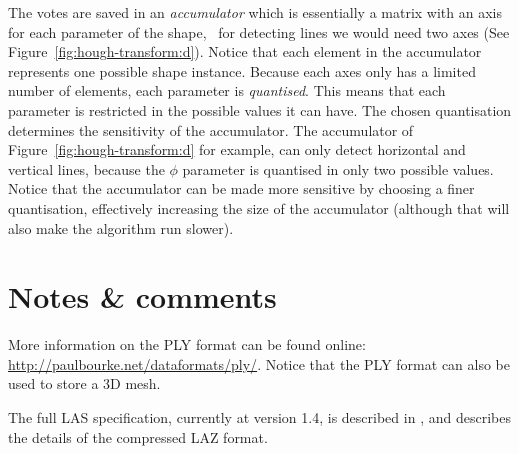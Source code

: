 The votes are saved in an \emph{accumulator} which is essentially a matrix with an axis for each parameter of the shape, \eg\ for detecting lines we would need two axes (See Figure~\ref{fig:hough-transform:d}).
Notice that each element in the accumulator represents one possible shape instance.
Because each axes only has a limited number of elements, each parameter is \emph{quantised}.
This means that each parameter is restricted in the possible values it can have.
The chosen quantisation determines the sensitivity of the accumulator.
The accumulator of Figure~\ref{fig:hough-transform:d} for example, can only detect horizontal and vertical lines, because the $\phi$ parameter is quantised in only two possible values.
Notice that the accumulator can be made more sensitive by choosing a finer quantisation, effectively increasing the size of the accumulator (although that will also make the algorithm run slower).


%
%
%
%
%


%
\section{Notes \& comments}
More information on the PLY format can be found online: \url{http://paulbourke.net/dataformats/ply/}. 
Notice that the PLY format can also be used to store a 3D mesh.

The full LAS specification, currently at version 1.4, is described in \citet{LAS13}, and \citet{Isenburg13} describes the details of the compressed LAZ format.


